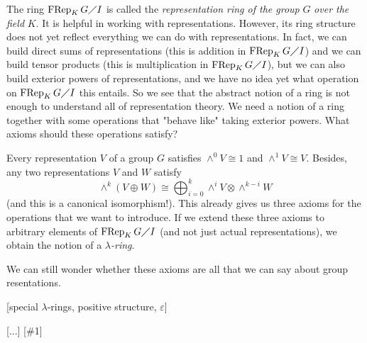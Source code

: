 \documentclass[12pt,final,notitlepage,onecolumn,german]{article}%
\begin{document}
The ring $\operatorname*{FRep}_{K}G\diagup I$ is called the
\textit{representation ring of the group }$G$\textit{ over the field }$K$. It
is helpful in working with representations. However, its ring structure does
not yet reflect everything we can do with representations. In fact, we can
build direct sums of representations (this is addition in
$\operatorname*{FRep}_{K}G\diagup I$) and we can build tensor products (this
is multiplication in $\operatorname*{FRep}_{K}G\diagup I$), but we can also
build exterior powers of representations, and we have no idea yet what
operation on $\operatorname*{FRep}_{K}G\diagup I$ this entails. So we see that
the abstract notion of a ring is not enough to understand all of
representation theory. We need a notion of a ring together with some
operations that "behave like" taking exterior powers. What axioms should these
operations satisfy?

Every representation $V$ of a group $G$ satisfies $\wedge^{0}V\cong1$ and
$\wedge^{1}V\cong V$. Besides, any two representations $V$ and $W$ satisfy%
\[
\wedge^{k}\left(  V\oplus W\right)  \cong\bigoplus_{i=0}^{k}\wedge^{i}%
V\otimes\wedge^{k-i}W
\]
(and this is a canonical isomorphism!). This already gives us three axioms for
the operations that we want to introduce. If we extend these three axioms to
arbitrary elements of $\operatorname*{FRep}_{K}G\diagup I$ (and not just
actual representations), we obtain the notion of a $\lambda$\textit{-ring}.

We can still wonder whether these axioms are all that we can say about group resentations.

[special $\lambda$-rings, positive structure, $\varepsilon$]

[...] [\#1]

\begin{center}
\end{center}
\end{document}
